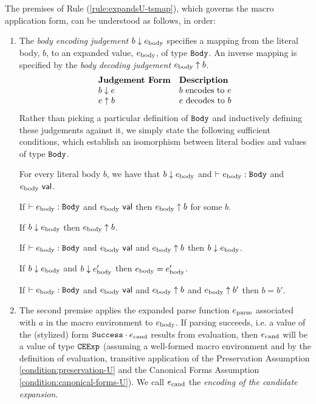The premises of Rule (\ref{rule:expandsU-tsmap}), which governs the macro application form, can be understood as follows, in order:
\begin{enumerate}
\item The \emph{body encoding judgement} $b \downarrow e_\text{body}$ specifies a mapping from the literal body, $b$, to an expanded value, $e_\text{body}$, of type $\mathtt{Body}$. An inverse mapping is specified by the \emph{body decoding judgement} $e_\text{body} \uparrow b$.
\[\begin{array}{ll}
\textbf{Judgement Form} & \textbf{Description}\\
b \downarrow e & \text{$b$ encodes to $e$}\\
e \uparrow b & \text{$e$ decodes to $b$}
\end{array}\]
Rather than picking a particular definition of $\mathtt{Body}$ and inductively defining these judgements against it, we simply state the following sufficient conditions, which establish an isomorphism between literal bodies and values of type $\mathtt{Body}$.
\begin{condition} For every literal body $b$, we have that $b \downarrow e_\text{body}$ and $\vdash e_\text{body} : \mathtt{Body}$ and $e_\text{body}~\mathsf{val}$. \end{condition}
\begin{condition} If $\vdash e_\text{body} : \mathtt{Body}$ and $e_\text{body}~\mathsf{val}$ then $e_\text{body} \uparrow b$ for some $b$. \end{condition}
\begin{condition} If $b \downarrow e_\text{body}$ then $e_\text{body} \uparrow b$. \end{condition}
\begin{condition} If $\vdash e_\text{body} : \mathtt{Body}$ and $e_\text{body}~\mathsf{val}$ and $e_\text{body} \uparrow b$ then $b \downarrow e_\text{body}$. \end{condition}
\begin{condition} If $b \downarrow e_\text{body}$ and $b \downarrow e_\text{body}'$ then $e_\text{body} = e_\text{body}'$. \end{condition}
\begin{condition} If $\vdash e_\text{body} : \mathtt{Body}$ and $e_\text{body}~\mathsf{val}$ and $e_\text{body} \uparrow b$ and $e_\text{body} \uparrow b'$ then $b=b'$. \end{condition}

\item The second premise applies the expanded parse function $e_\text{parse}$ associated with $a$ in the macro environment to $e_\text{body}$. If parsing succeeds, i.e. a value of the (stylized) form $\mathtt{Success} \cdot e_\text{cand}$ results from evaluation, then $e_\text{cand}$ will be a value of type $\mathtt{CEExp}$ (assuming a well-formed macro environment and by the definition of evaluation, transitive application of the Preservation Assumption \ref{condition:preservation-U} and the Canonical Forms Assumption \ref{condition:canonical-forms-U}). We call $e_\text{cand}$ the \emph{encoding of the candidate expansion}.


\end{enumerate}
